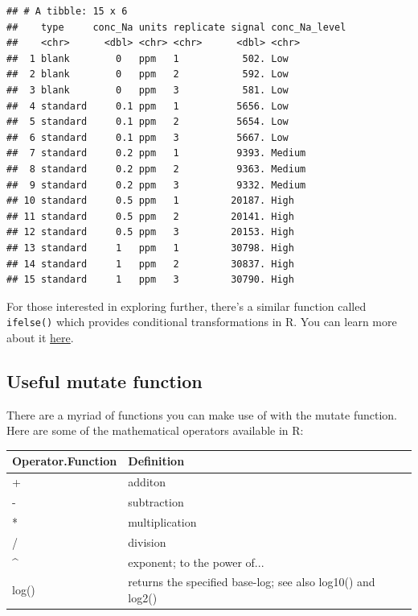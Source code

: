 \documentclass[
]{book}
\begin{document}
\begin{verbatim}
## # A tibble: 15 x 6
##    type     conc_Na units replicate signal conc_Na_level
##    <chr>      <dbl> <chr> <chr>      <dbl> <chr>        
##  1 blank        0   ppm   1           502. Low          
##  2 blank        0   ppm   2           592. Low          
##  3 blank        0   ppm   3           581. Low          
##  4 standard     0.1 ppm   1          5656. Low          
##  5 standard     0.1 ppm   2          5654. Low          
##  6 standard     0.1 ppm   3          5667. Low          
##  7 standard     0.2 ppm   1          9393. Medium       
##  8 standard     0.2 ppm   2          9363. Medium       
##  9 standard     0.2 ppm   3          9332. Medium       
## 10 standard     0.5 ppm   1         20187. High         
## 11 standard     0.5 ppm   2         20141. High         
## 12 standard     0.5 ppm   3         20153. High         
## 13 standard     1   ppm   1         30798. High         
## 14 standard     1   ppm   2         30837. High         
## 15 standard     1   ppm   3         30790. High
\end{verbatim}

For those interested in exploring further, there's a similar function called \texttt{ifelse()} which provides conditional transformations in R. You can learn more about it \href{https://www.rdocumentation.org/packages/base/versions/3.6.2/topics/ifelse}{here}.

\hypertarget{useful-mutate-function}{%
\subsection{Useful mutate function}\label{useful-mutate-function}}

There are a myriad of functions you can make use of with the mutate function. Here are some of the mathematical operators available in R:

\begin{tabular}{l|l}
\hline
Operator.Function & Definition\\
\hline
+ & additon\\
\hline
- & subtraction\\
\hline
* & multiplication\\
\hline
/ & division\\
\hline
\textasciicircum{} & exponent; to the power of...\\
\hline
log() & returns the specified base-log; see also log10() and log2()\\
\hline
\end{tabular}
\end{document}
